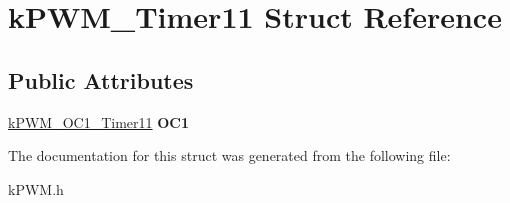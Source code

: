 \hypertarget{structkPWM__Timer11}{}\section{k\+P\+W\+M\+\_\+\+Timer11 Struct Reference}
\label{structkPWM__Timer11}
\subsection*{Public Attributes}
\begin{DoxyCompactItemize}
\item 
\hyperlink{structkPWM__OC1__Timer11}{k\+P\+W\+M\+\_\+\+O\+C1\+\_\+\+Timer11} {\bfseries O\+C1}\hypertarget{structkPWM__Timer11_a949a837d3dee15e430a8e03ee5898c8d}{}\label{structkPWM__Timer11_a949a837d3dee15e430a8e03ee5898c8d}

\end{DoxyCompactItemize}


The documentation for this struct was generated from the following file\+:\begin{DoxyCompactItemize}
\item 
k\+P\+W\+M.\+h\end{DoxyCompactItemize}
